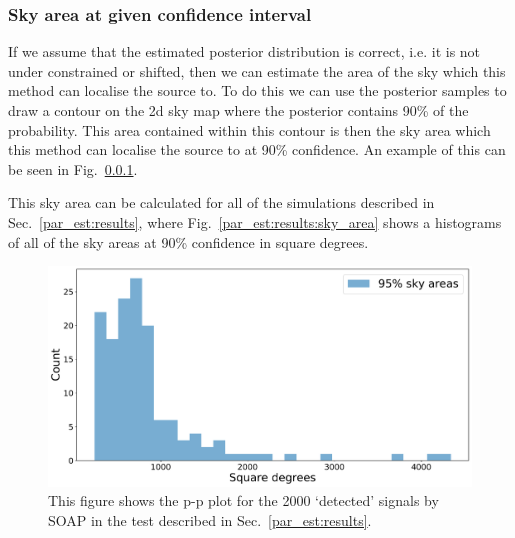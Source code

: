 \subsubsection{Sky area at given confidence interval}

If we assume that the estimated posterior distribution is correct, i.e. it is not under constrained or shifted, then we can estimate the area of the sky which this method can localise the source to. 
To do this we can use the posterior samples to draw a contour on the 2d sky map where the posterior contains 90\% of the probability.
This area contained within this contour is then the sky area which this method can localise the source to at 90\% confidence.
An example of this can be seen in Fig.~\ref{}.

This sky area can be calculated for all of the simulations described in Sec.~\ref{par_est:results}, where Fig.~\ref{par_est:results:sky_area} shows a histograms of all of the sky areas at 90\% confidence in square degrees.
%
\begin{figure}[ht]
    \centering
    \includegraphics[width=\linewidth]{C5_parameter/sky_area_hist.pdf}
    \caption[p-p plot for the CW simulations]{This figure shows the p-p plot for the 2000 `detected' signals by SOAP in the test described in Sec.~\ref{par_est:results}. }
    \label{par_est:results:sky_Area}
\end{figure}



